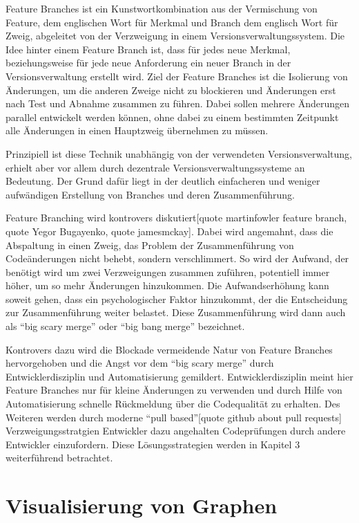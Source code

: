 Feature Branches ist ein Kunstwortkombination aus der Vermischung von Feature, dem englischen Wort für Merkmal und Branch dem englisch Wort für Zweig, abgeleitet von der Verzweigung in einem Versionsverwaltungssystem. Die Idee hinter einem Feature Branch ist, dass für jedes neue Merkmal, beziehungsweise für jede neue Anforderung ein neuer Branch in der Versionsverwaltung erstellt wird. Ziel der Feature Branches ist die Isolierung von Änderungen, um die anderen Zweige nicht zu blockieren und Änderungen erst nach Test und Abnahme zusammen zu führen. Dabei sollen mehrere Änderungen parallel entwickelt werden können, ohne dabei zu einem bestimmten Zeitpunkt alle Änderungen in einen Hauptzweig übernehmen zu müssen.

Prinzipiell ist diese Technik unabhängig von der verwendeten Versionsverwaltung, erhielt aber vor allem durch dezentrale Versionsverwaltungssysteme an Bedeutung. Der Grund dafür liegt in der deutlich einfacheren und weniger aufwändigen Erstellung von Branches und deren Zusammenführung.

Feature Branching wird kontrovers diskutiert[quote martinfowler feature branch, quote Yegor Bugayenko, quote jamesmckay]. Dabei wird angemahnt, dass die Abspaltung in einen Zweig, das Problem der Zusammenführung von Codeänderungen nicht behebt, sondern verschlimmert. So wird der Aufwand, der benötigt wird um zwei Verzweigungen zusammen zuführen, potentiell immer höher, um so mehr Änderungen hinzukommen. Die Aufwandserhöhung kann soweit gehen, dass ein psychologischer Faktor hinzukommt, der die Entscheidung zur Zusammenführung weiter belastet. Diese Zusammenführung wird dann auch als ``big scary merge'' oder ``big bang merge'' bezeichnet.

Kontrovers dazu wird die Blockade vermeidende Natur von Feature Branches hervorgehoben und die Angst vor dem ``big scary merge'' durch Entwicklerdisziplin und Automatisierung gemildert. Entwicklerdisziplin meint hier Feature Branches nur für kleine Änderungen zu verwenden und durch Hilfe von Automatisierung schnelle Rückmeldung über die Codequalität zu erhalten. Des Weiteren werden durch moderne ``pull based''[quote github about pull requests] Verzweigungsstratgien Entwickler dazu angehalten Codeprüfungen durch andere Entwickler einzufordern. Diese Lösungsstrategien werden in Kapitel 3 weiterführend betrachtet.

\section{Visualisierung von Graphen}